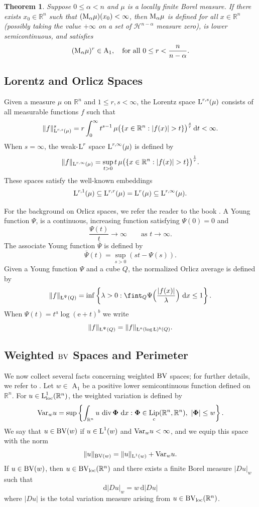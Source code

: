 \documentclass[11pt, a4paper, reqno]{amsart}
\newcommand{\R}{\mathbb R}
\newcommand{\A}{\textup A}
\newcommand{\Haus}{\mathcal H }
\newcommand{\al}{\alpha}
\newcommand{\dx}{\,{\mathrm dx}}
\newcommand{\Lup}{\textup{L}}
\newcommand{\BV}{\textup{BV}}
\newcommand{\Ldash}{\textup{\L}}
\DeclareMathOperator{\Lip}{\textup{Lip}}
\DeclareMathOperator{\Div}{\textup{div}}
\newtheorem{theorem}{Theorem}[section]
\theoremstyle{definition}
\theoremstyle{remark}
\begin{document}
\begin{theorem}\label{MalA1}
Suppose $0\le \alpha<n$ and $\mu$ is a locally finite Borel measure. If there exists $x_0\in \R^n$ such that $(\textup{M}_\alpha\mu)(x_0)<\infty$, then $\textup{M}_\alpha\mu$ is defined for all $x\in \R^n$ (possibly taking the value $+\infty$ on a set of $\Haus^{n-\al}$ measure zero), is lower semicontinuous, and satisfies
\[
(\textup{M}_\alpha\mu)^r \in \A_1,
\quad \text{for all } 0\le r<\frac{n}{n-\alpha}.
\]
\end{theorem}

\subsection{Lorentz and Orlicz Spaces}


Given a measure $\mu$ on $\R^n$ and $1\le r,s<\infty$, the Lorentz space $\Lup^{r,s}(\mu)$ consists of all measurable functions $f$ such that
\[
\|f\|_{\Lup^{r,s}(\mu)}^s
= r\int_0^\infty t^{s-1}\,
\mu\big(\{x\in \R^n:|f(x)|>t\}\big)^{\frac{s}{r}}\,\mathrm dt<\infty.
\]
When $s=\infty$, the weak-$\Lup^r$ space $\Lup^{r,\infty}(\mu)$ is defined by
\[
\|f\|_{\Lup^{r,\infty}(\mu)}
=\sup_{t>0} t\,\mu\big(\{x\in \R^n:|f(x)|>t\}\big)^{\frac{1}{r}}.
\]
These spaces satisfy the well-known embeddings
\[
\Lup^{r,1}(\mu)\subseteq \Lup^{r,r}(\mu)=\Lup^{r}(\mu)\subseteq \Lup^{r,\infty}(\mu).
\]

For the background on Orlicz spaces, we refer the reader to the book \cite[Chapter 5]{CMP}. A Young function $\Psi$, is a continuous, increasing function satisfying $\Psi(0)=0$ and
\[
\frac{\Psi(t)}{t}\to\infty \qquad \text{as } t\to\infty.
\]
The associate Young function $\bar{\Psi}$ is defined by
\[
\bar{\Psi}(t)=\sup_{s>0}(st-\Psi(s)).
\]
Given a Young function $\Psi$ and a cube $Q$, the normalized Orlicz average is defined by
\[
\|f\|_{\Ldash^\Psi(Q)}
=\inf\left\{\lambda>0:\fint_Q\Psi\Big(\frac{|f(x)|}{\lambda}\Big)\,\dx\le 1\right\}.
\]
When $\Psi(t)=t^a\log(\mathrm e+t)^b$ we write 
$$\|f\|_{\Ldash^\Psi(Q)}=\|f\|_{\Ldash^a(\log \Ldash)^b(Q)}.$$
\subsection{Weighted $\BV$ Spaces and Perimeter}

We now collect several facts concerning weighted $\BV$ spaces; for further details, we refer to \cite{BGKM}. Let $w\in$ A$_1$ be a positive lower semicontinuous function defined on $\R^n$. 
For $u\in \Lup^1_{\text{loc}}(\R^n)$, the weighted variation is defined by
\[
\textup{Var}_w u
=\sup\left\{\int_{\R^n}u\,\Div \boldsymbol{\Phi}\,\dx
:\boldsymbol{\Phi}\in \Lip_c(\R^n,\R^n),\ |\boldsymbol{\Phi}|\le w\right\}.
\]
We say that $u\in \BV(w)$ if $u\in \Lup^1(w)$ and $\textup{Var}_w u<\infty$, and we equip this space with the norm
\[
\|u\|_{\BV(w)}=\|u\|_{\Lup^1(w)}+\textup{Var}_w u.
\]
If $u\in \BV(w)$, then $u\in \BV_{\text{loc}}(\R^n)$ and there exists a finite Borel measure $|Du|_w$ such that
\begin{equation}\label{absolcont}
\mathrm d|Du|_w=w\,\mathrm d|Du|
\end{equation}
where $|Du|$ is the total variation measure arising from $u\in \BV_{\text{loc}}(\R^n)$.
\end{document}
